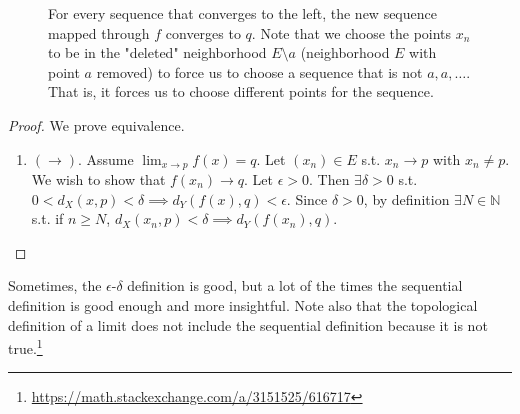\begin{theorem}
\begin{enumerate}
\begin{figure}[H]
        \caption{For every sequence that converges to the left, the new sequence mapped through $f$ converges to $q$. Note that we choose the points $x_n$ to be in the "deleted" neighborhood $E\setminus a$ (neighborhood $E$ with point $a$ removed) to force us to choose a sequence that is not $a, a, \ldots$. That is, it forces us to choose different points for the sequence. } 
        \label{fig:sequential_limit_def}
      \end{figure}
    \end{enumerate}
  \end{theorem}
  \begin{proof}
    We prove equivalence. 
    \begin{enumerate}
      \item $(\to)$. Assume $\lim_{x \to p} f(x) = q$. Let $(x_n) \in E$ s.t. $x_n \to p$ with $x_n \neq p$. We wish to show that $f(x_n) \to q$. Let $\epsilon > 0$. Then $\exists \delta > 0$ s.t. $0 < d_X (x, p) < \delta \implies d_Y (f(x), q) < \epsilon$. Since $\delta > 0$, by definition $\exists N \in \mathbb{N}$ s.t. if $n \geq N$, $d_X (x_n , p) < \delta \implies d_Y (f(x_n), q)$. 
    \end{enumerate}
  \end{proof}

  Sometimes, the $\epsilon$-$\delta$ definition is good, but a lot of the times the sequential definition is good enough and more insightful. Note also that the topological definition of a limit does not include the sequential definition because it is not true.\footnote{\href{https://math.stackexchange.com/a/3151525/616717}{https://math.stackexchange.com/a/3151525/616717}}

